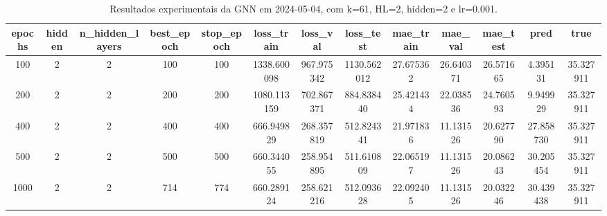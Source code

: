 \begin{table}[h]
\centering
\caption{Resultados experimentais da GNN em 2024-05-04, com k=61, HL=2, hidden=2 e lr=0.001.}
\label{tab:gnn_results_k61_hl2_h2_d20240504}
\begin{tabular}{ccccccccccccc}
\toprule
epochs & hidden & n\_hidden\_layers & best\_epoch & stop\_epoch & loss\_train & loss\_val & loss\_test & mae\_train & mae\_val & mae\_test & pred & true \\
\midrule
100 & 2 & 2 & 100 & 100 & 1338.600098 & 967.975342 & 1130.562012 & 27.675362 & 26.640371 & 26.571665 & 4.395131 & 35.327911 \\
200 & 2 & 2 & 200 & 200 & 1080.113159 & 702.867371 & 884.838440 & 25.421434 & 22.038536 & 24.760593 & 9.949929 & 35.327911 \\
400 & 2 & 2 & 400 & 400 & 666.949829 & 268.357819 & 512.824341 & 21.971836 & 11.131526 & 20.627790 & 27.858730 & 35.327911 \\
500 & 2 & 2 & 500 & 500 & 660.344055 & 258.954895 & 511.610809 & 22.065197 & 11.131526 & 20.086243 & 30.205454 & 35.327911 \\
1000 & 2 & 2 & 714 & 774 & 660.289124 & 258.621216 & 512.093628 & 22.092405 & 11.131526 & 20.032246 & 30.439438 & 35.327911 \\
\bottomrule
\end{tabular}
\end{table}
